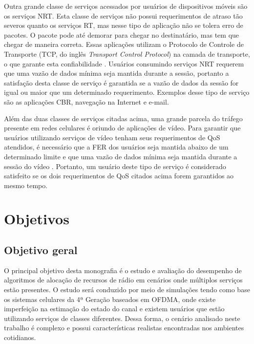 Outra grande classe de serviços acessados por usuários de dispositivos móveis são os serviços NRT. Esta classe de serviços não possui requerimentos de atraso tão severos quanto os serviços RT, mas nesse tipo de aplicação não se tolera erro de pacotes. O pacote pode até demorar para chegar no destinatário, mas tem que chegar de maneira correta. Essas aplicações utilizam o Protocolo de Controle de Transporte (TCP, do inglês \textit{Transport Control Protocol}) na camada de transporte, o que garante esta confiabilidade \cite{Nasralla2013}. Usuários consumindo serviços NRT requerem que uma vazão de dados mínima seja mantida durante a sessão, portanto a satisfação desta classe de serviço é garantida se a vazão de dados da sessão for igual ou maior que um determinado requerimento. Exemplos desse tipo de serviço são as aplicações \acs{CBR}, navegação na Internet e e-mail.

Além das duas classes de serviços citadas acima, uma grande parcela do tráfego presente em redes celulares é oriundo de aplicações de vídeo. Para garantir que usuários utilizando serviços de vídeo tenham seus requerimentos de QoS atendidos, é necessário que a \acs{FER} dos usuários seja mantida abaixo de um determinado limite e que uma vazão de dados mínima seja mantida durante a sessão do vídeo \cite{basukala2009performance, Art:Andrews2001}. Portanto, um usuário deste tipo de serviço é considerado satisfeito se os dois requerimentos de QoS citados acima forem garantidos ao mesmo tempo.

\section{Objetivos}

\subsection{Objetivo geral}

O principal objetivo desta monografia é o estudo e avaliação do desempenho de algoritmos de alocação de recursos de rádio em cenários onde múltiplos serviços estão presentes. O estudo será conduzido por meio de simulações tendo como base os sistemas celulares da 4ª Geração baseados em {OFDMA}, onde existe imperfeição na estimação do estado do canal e existem usuários que estão utilizando serviços de classes diferentes. Dessa forma, o cenário analisado neste trabalho é complexo e possui características realistas encontradas nos ambientes cotidianos.


